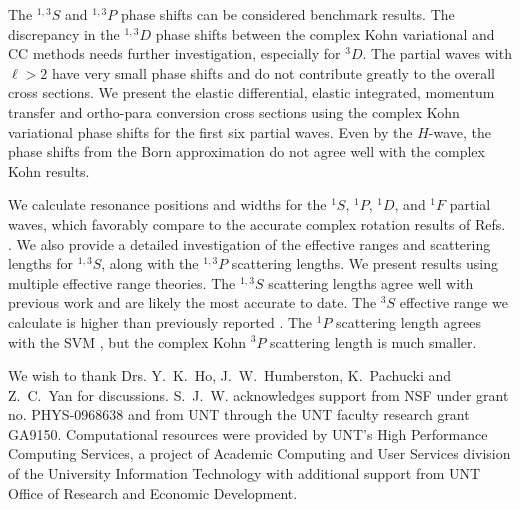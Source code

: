 \documentclass[preprint,showpacs,showkeys,preprintnumbers,amsmath,amssymb,longbibliography,pra,aps]{revtex4-1}
\begin{document}
The $^{1,3}S$ and $^{1,3}P$ phase shifts can be considered benchmark results. The 
discrepancy in the $^{1,3}D$ phase shifts between the complex Kohn variational 
and CC methods needs further investigation, especially for $^3D$. The partial 
waves with $\ell > 2$ have very small phase shifts and do not contribute 
greatly to the overall cross sections. We present the elastic differential, elastic 
integrated, momentum transfer and ortho-para conversion cross sections using 
the complex Kohn variational phase shifts for
the first six partial waves. Even by the $H$-wave, the phase shifts from the Born
approximation do not agree well with the complex Kohn results.

We calculate resonance positions and widths for the $^1S$, $^1P$, $^1D$, and
$^1F$ partial waves, which favorably compare to the accurate complex 
rotation results of Refs. \cite{Yan1999,Yan1998a,Ho1998,Ho2000}. We also 
provide a detailed investigation of the effective ranges and scattering 
lengths for $^{1,3}S$, along with the $^{1,3}P$ scattering lengths. We 
present results using multiple effective range theories.
The $^{1,3}S$ scattering 
lengths agree well with previous work
\cite{VanReeth2003,Blackwood2002,Blackwood2004,Ivanov2002}
and are likely the most accurate to 
date. The $^3S$ effective range we calculate is higher than previously 
reported \cite{VanReeth2003,Blackwood2002,Ivanov2002}.
The $^1P$ scattering length agrees with the SVM \cite{Ivanov2002}, 
but the complex Kohn $^3P$ scattering length is much smaller.


\begin{acknowledgments}
We wish to thank Drs. Y.~K.~Ho, J.~W.~Humberston, K.~Pachucki and Z.~C.~Yan 
for discussions. S.~J.~W. acknowledges support from NSF under grant no.
PHYS-0968638 and from UNT through the UNT faculty research grant GA9150. 
Computational resources were provided by UNT's High Performance Computing 
Services, a project of Academic Computing and User Services division of the 
University Information Technology with additional support from UNT Office of 
Research and Economic Development.
\end{acknowledgments}



\end{document}
